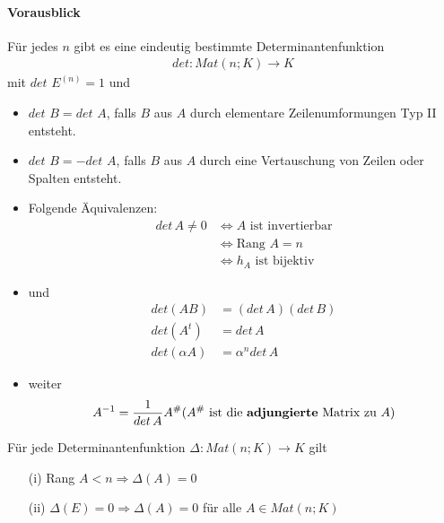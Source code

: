 \documentclass[11pt]{report}
\newcommand*\f[1] {\textbf{#1}}
\begin{document}
\paragraph{Vorausblick}
Für jedes $n$ gibt es eine eindeutig bestimmte Determinantenfunktion
\begin{align}
det: Mat(n;K) \rightarrow K
\end{align}
mit $det$ $E^{(n)} = 1$ und 
\begin{itemize}
 \item $det$ $B = det$ $A$, falls $B$ aus $A$ durch elementare Zeilenumformungen Typ II entsteht.
 \item $det$ $B = -det$ $A$, falls $B$ aus $A$ durch eine Vertauschung von Zeilen oder Spalten entsteht.
 \item Folgende Äquivalenzen:
\begin{align}
det\,A \neq 0 &\Leftrightarrow A \text{ ist invertierbar} \\
&\Leftrightarrow \text{Rang } A = n \\
&\Leftrightarrow h_A \text{ ist bijektiv}
\end{align}
\item und
\begin{align}
det(AB) &= (det\,A)(det\,B) \\
det(A^t) &= det\,A \\
det(\alpha A) &= \alpha^n det\,A 
\end{align}
\item weiter
\begin{align}
A^{-1} = \frac{1}{det\,A} A^{\#} (A^{\#} \text{ ist die \f{adjungierte} Matrix zu } A)
\end{align}
\end{itemize}

\begin{lemma}
\label{lemma611}
Für jede Determinantenfunktion $\Delta: Mat(n;K) \rightarrow K$ gilt
\begin{itemize}
 \item[(i)] Rang $A < n \Rightarrow \Delta(A) = 0$
 \item[(ii)] $\Delta(E) = 0 \Rightarrow \Delta(A) = 0$ für alle $A \in Mat(n;K)$
\end{itemize}
\end{lemma}
\end{document}
